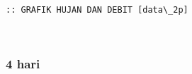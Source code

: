 \documentclass[11pt]{article}
\begin{document}
    \begin{Verbatim}[commandchars=\\\{\}]
:: GRAFIK HUJAN DAN DEBIT [data\_2p]
    \end{Verbatim}

    \begin{center}
    \end{center}
    { \hspace*{\fill} \\}
    
    \hypertarget{hari}{%
\subsubsection{4 hari}\label{hari}}
\end{document}
